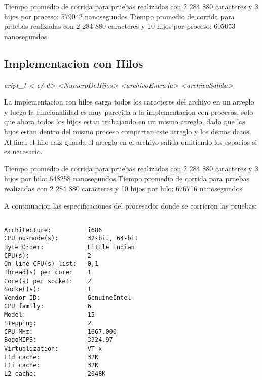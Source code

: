 \documentclass[paper=a4, fontsize=11pt]{scrartcl} %
\begin{document}
Tiempo promedio de corrida para pruebas realizadas con 2 284 880 caracteres y 3 hijos por proceso: 579042 nanosegundos
Tiempo promedio de corrida para pruebas realizadas con 2 284 880 caracteres y 10 hijos por proceso: 605053 nanosegundos


\subsection{Implementacion con Hilos}\newline

\emph{cript\_t <-c/-d> <NumeroDeHijos> <archivoEntrada> <archivoSalida>}\newline

La implementacion con hilos carga todos los caracteres del archivo en un arreglo y luego la funcionalidad es muy parecida a la implementacion con procesos, solo que ahora todos los hijos estan trabajando en un mismo arreglo, dado que los hijos estan dentro del mismo proceso comparten este arreglo y los demas datos. Al final el hilo raiz guarda el arreglo en el archivo salida omitiendo los espacios si es necesario.

Tiempo promedio de corrida para pruebas realizadas con 2 284 880 caracteres y 3 hijos por hilo: 648258 nanosegundos
Tiempo promedio de corrida para pruebas realizadas con 2 284 880 caracteres y 10 hijos por hilo: 676716 nanosegundos

A continuacion las especificaciones del procesador donde se corrieron las pruebas:

\begin{verbatim}

Architecture:          i686
CPU op-mode(s):        32-bit, 64-bit
Byte Order:            Little Endian
CPU(s):                2
On-line CPU(s) list:   0,1
Thread(s) per core:    1
Core(s) per socket:    2
Socket(s):             1
Vendor ID:             GenuineIntel
CPU family:            6
Model:                 15
Stepping:              2
CPU MHz:               1667.000
BogoMIPS:              3324.97
Virtualization:        VT-x
L1d cache:             32K
L1i cache:             32K
L2 cache:              2048K

\end{verbatim}
\end{document}

